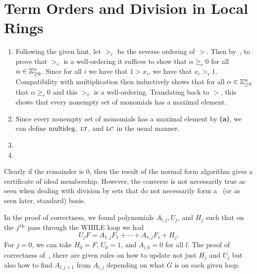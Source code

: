 \documentclass[letterpaper, 11pt, oneside]{book}
\begin{document}
\section{Term Orders and Division in Local Rings}

\begin{sol}\label{ex:UAG_4.3.8}
  \begin{enumerate}
    \item Following the given hint, let $>_{r}$ be the reverse ordering of $>$.
          Then by~\cite[\S 2.4, Corollary 6]{book:IVA}, to prove that $>_{r}$ is a well-ordering it suffices to show that $\alpha \geq_{r} 0$ for all $\alpha \in \mathbb{Z}_{\geq 0}^{n}$.
          Since for all $i$ we have that $1 > x_{i}$, we have that $x_{i} >_{r} 1$.
          Compatibility with multiplication then inductively shows that for all $\alpha \in \mathbb{Z}_{\geq 0}^{n}$ that $\alpha \geq_{r} 0$ and this $>_{r}$ is a well-ordering.
          Translating back to $>$, this shows that every nonempty set of monomials has a maximal element.
    \item Since every nonempty set of monomials has a maximal element by \textbf{(a)}, we can define $\mdeg,\ \lt$, and $\operatorname{\textsc{lc}}$ in the usual manner.
    \item {}
    \item {}
  \end{enumerate}
\end{sol}

\begin{sol}\label{ex:UAG_4.3.9}
  Clearly if the remainder is $0$, then the result of the normal form algorithm gives a certificate of ideal membership.
  However, the converse is not necessarily true as seen when dealing with division by sets that do not necessarily form a \Grobner\ (or as seen later, standard) basis.
\end{sol}

\begin{sol}\label{ex:UAG_4.3.10}
  In the proof of correctness, we found polynomials $A_{l, j}, U_{j}$, and $H_{j}$ such that on the $j\textsuperscript{th}$ pass through the WHILE loop we had
  \[
    U_{j}F = A_{1, j}F_{1} + \cdots + A_{s, j}F_{s} + H_{j}.
  \]
  For $j = 0$, we can take $H_{0} = F$, $U_{0} = 1$, and $A_{l, 0} = 0$ for all $l$.
  The proof of correctness of~\cite[\S 4.2, Theorem 3.10]{book:UAG}, there are given rules on how to update not just $H_{j}$ and $U_{j}$ but also how to find $A_{l, j + 1}$ from $A_{l, j}$ depending on what $G$ is on each given loop.
\end{sol}
\end{document}
